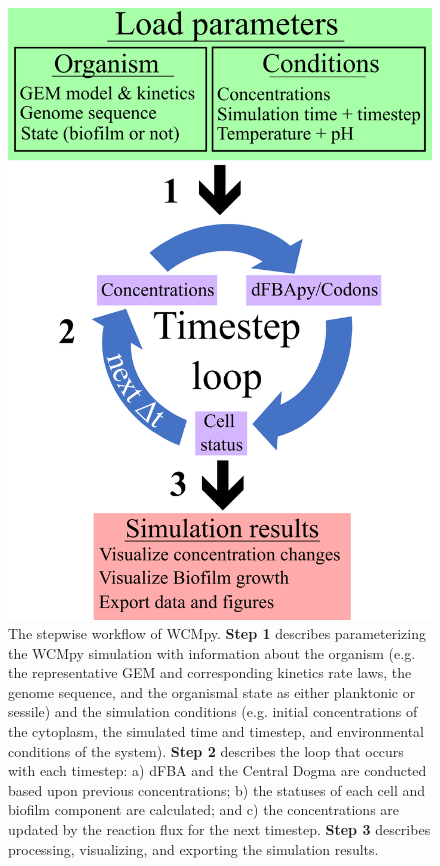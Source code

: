 \begin{figure}
    \centering
    \includegraphics{images/WCMpy/wcmpy_workflow.png}
    \caption{
        The stepwise workflow of WCMpy. \textbf{Step 1} describes parameterizing the WCMpy simulation with information about the organism (e.g. the representative GEM and corresponding kinetics rate laws, the genome sequence, and the organismal state as either planktonic or sessile) and the simulation conditions (e.g. initial concentrations of the cytoplasm, the simulated time and timestep, and environmental conditions of the system). \textbf{Step 2} describes the loop that occurs with each timestep: a) dFBA and the Central Dogma are conducted based upon previous concentrations; b) the statuses of each cell and biofilm component are calculated; and c) the concentrations are updated by the reaction flux for the next timestep. \textbf{Step 3} describes processing, visualizing, and exporting the simulation results. 
    }
    \label{wcmpy_workflow}
\end{figure}

